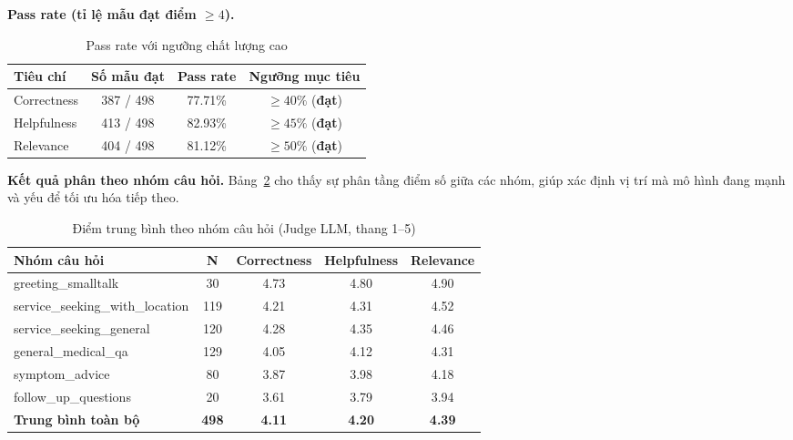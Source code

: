 \noindent\textbf{Pass rate (tỉ lệ mẫu đạt điểm $\ge 4$).}

\begin{table}[H]
\centering
\begin{tabular}{|l|c|c|c|}
\hline
\textbf{Tiêu chí} & \textbf{Số mẫu đạt} & \textbf{Pass rate} & \textbf{Ngưỡng mục tiêu} \\
\hline
Correctness & 387 / 498 & 77.71\% & $\ge 40\%$ (\textbf{đạt}) \\
\hline
Helpfulness & 413 / 498 & 82.93\% & $\ge 45\%$ (\textbf{đạt}) \\
\hline
Relevance   & 404 / 498 & 81.12\% & $\ge 50\%$ (\textbf{đạt}) \\
\hline
\end{tabular}
\caption{Pass rate với ngưỡng chất lượng cao}
\label{tab:e2e_pass_rate}
\end{table}

\noindent\textbf{Kết quả phân theo nhóm câu hỏi.}
Bảng~\ref{tab:e2e_by_category} cho thấy sự phân tầng điểm số giữa các nhóm, giúp xác định vị trí mà mô hình đang mạnh và yếu để tối ưu hóa tiếp theo.

\begin{table}[H]
\centering
\begin{tabular}{|l|c|c|c|c|}
\hline
\textbf{Nhóm câu hỏi} & \textbf{N} & \textbf{Correctness} & \textbf{Helpfulness} & \textbf{Relevance} \\
\hline
greeting\_smalltalk              & 30  & 4.73 & 4.80 & 4.90 \\
\hline
service\_seeking\_with\_location & 119 & 4.21 & 4.31 & 4.52 \\
\hline
service\_seeking\_general        & 120 & 4.28 & 4.35 & 4.46 \\
\hline
general\_medical\_qa             & 129 & 4.05 & 4.12 & 4.31 \\
\hline
symptom\_advice                  & 80  & 3.87 & 3.98 & 4.18 \\
\hline
follow\_up\_questions            & 20  & 3.61 & 3.79 & 3.94 \\
\hline
\textbf{Trung bình toàn bộ}      & \textbf{498} & \textbf{4.11} & \textbf{4.20} & \textbf{4.39} \\
\hline
\end{tabular}
\caption{Điểm trung bình theo nhóm câu hỏi (Judge LLM, thang 1--5)}
\label{tab:e2e_by_category}
\end{table}


